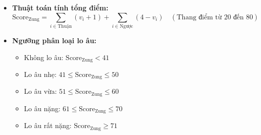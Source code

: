 \documentclass[12pt,a4paper]{article}
\begin{document}
\begin{itemize}
    Người dùng chọn theo tần suất xuất hiện: 0 (Không hoặc hiếm khi), 1 (Đôi khi), 2 (Phần lớn thời gian), 3 (Hầu như luôn luôn).
    \begin{itemize}
        \item \textbf{Đối với 15 câu thuận} (câu 1-5, 7-9, 11-13, 15-17, 20): Điểm số của câu $i$ là:
        \begin{equation}
            S_i = v_i + 1 \quad (S_i \in [1, 4])
        \end{equation}
        \item \textbf{Đối với 5 câu nghịch (đảo ngược)} (câu 6, 10, 14, 18, 19): Điểm số của câu $i$ được tính bằng cách lấy 4 trừ đi giá trị chọn:
        \begin{equation}
            S_i = 4 - v_i \quad (S_i \in [1, 4])
        \end{equation}
    \end{itemize}
    \item \textbf{Thuật toán tính tổng điểm:}
    \begin{equation}
        \text{Score}_{\text{Zung}} = \sum_{i \in \text{Thuận}} (v_i + 1) + \sum_{i \in \text{Ngược}} (4 - v_i) \quad (\text{Thang điểm từ } 20 \text{ đến } 80)
    \end{equation}
    \item \textbf{Ngưỡng phân loại lo âu:}
    \begin{itemize}
        \item Không lo âu: $\text{Score}_{\text{Zung}} < 41$
        \item Lo âu nhẹ: $41 \le \text{Score}_{\text{Zung}} \le 50$
        \item Lo âu vừa: $51 \le \text{Score}_{\text{Zung}} \le 60$
        \item Lo âu nặng: $61 \le \text{Score}_{\text{Zung}} \le 70$
        \item Lo âu rất nặng: $\text{Score}_{\text{Zung}} \ge 71$
    \end{itemize}
\end{itemize}
\end{document}
